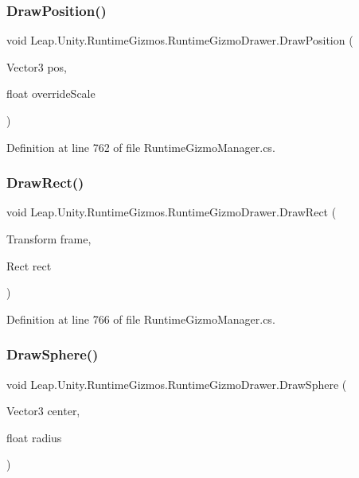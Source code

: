 \subsubsection{\texorpdfstring{DrawPosition()}{DrawPosition()}\hspace{0.1cm}{\footnotesize\ttfamily [3/3]}}
{\footnotesize\ttfamily void Leap.\+Unity.\+Runtime\+Gizmos.\+Runtime\+Gizmo\+Drawer.\+Draw\+Position (\begin{DoxyParamCaption}\item[{Vector3}]{pos,  }\item[{float}]{override\+Scale }\end{DoxyParamCaption})}



Definition at line 762 of file Runtime\+Gizmo\+Manager.\+cs.

\mbox{\label{class_leap_1_1_unity_1_1_runtime_gizmos_1_1_runtime_gizmo_drawer_a9f67b07d4720921c38ec3c6f0aa0f9fa}} 
\subsubsection{\texorpdfstring{DrawRect()}{DrawRect()}}
{\footnotesize\ttfamily void Leap.\+Unity.\+Runtime\+Gizmos.\+Runtime\+Gizmo\+Drawer.\+Draw\+Rect (\begin{DoxyParamCaption}\item[{Transform}]{frame,  }\item[{Rect}]{rect }\end{DoxyParamCaption})}



Definition at line 766 of file Runtime\+Gizmo\+Manager.\+cs.

\mbox{\label{class_leap_1_1_unity_1_1_runtime_gizmos_1_1_runtime_gizmo_drawer_acdd890c95db06e3d95bbafd740ed11ef}} 
\subsubsection{\texorpdfstring{DrawSphere()}{DrawSphere()}}
{\footnotesize\ttfamily void Leap.\+Unity.\+Runtime\+Gizmos.\+Runtime\+Gizmo\+Drawer.\+Draw\+Sphere (\begin{DoxyParamCaption}\item[{Vector3}]{center,  }\item[{float}]{radius }\end{DoxyParamCaption})}



